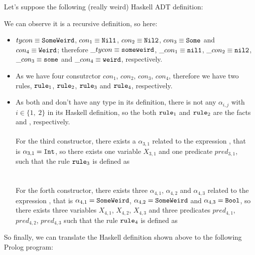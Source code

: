 \begin{example}[SomeWeird]
	Let's suppose the following (really weird) Haskell ADT definition:
	
	We can observe it is a recursive definition, so here:
	\begin{itemize}
		\item $tycon \equiv \texttt{SomeWeird}$, $con_1 \equiv \texttt{Nil1}$, $con_2 \equiv \texttt{Nil2}$, $con_3 \equiv \texttt{Some}$ and $con_4 \equiv \texttt{Weird}$; therefore $\_tycon \equiv \texttt{someweird}$, $\_con_1 \equiv \texttt{nil1}$, $\_con_2 \equiv \texttt{nil2}$, $\_con_3 \equiv \texttt{some}$ and $\_con_4 \equiv \texttt{weird}$, respectively.
		\item As we have four consutrctor $con_1$, $con_2$, $con_3$, $con_4$, therefore we have two rules, $\texttt{rule}_1$, $\texttt{rule}_2$, $\texttt{rule}_3$ and $\texttt{rule}_4$, respectively.
		\item As both  and  don't have any type in its definition, there is not any $\alpha_{i,j}$ with $i \in \{ 1,\; 2 \}$ in its Haskell definition, so the both $\texttt{rule}_1$ and $\texttt{rule}_2$ are the facts  and , respectively.\\\\
		      For the third constructor, there exists a $\alpha_{3,1}$ related to the expression , that is $\alpha_{3,1} = \texttt{Int}$, so there exists one variable $X_{3,1}$ and one predicate $pred_{3,1}$, such that the rule $\texttt{rule}_3$ is defined as \\ \\\\
		      For the forth constructor, there exists three $\alpha_{4,1}$, $\alpha_{4,2}$ and $\alpha_{4,3}$ related to the expression , that is $\alpha_{4,1} = \texttt{SomeWeird}$, $\alpha_{4,2} = \texttt{SomeWeird}$ and $\alpha_{4,3} = \texttt{Bool}$, so there exists three variables $X_{4,1}$, $X_{4,2}$, $X_{4,3}$ and three predicates $pred_{4,1}$, $pred_{4,2}$, $pred_{4,3}$ such that the rule $\texttt{rule}_4$ is defined as \\ 
	\end{itemize}
	So finally, we can translate the Haskell definition shown above to the following Prolog program:\\

\end{example}
